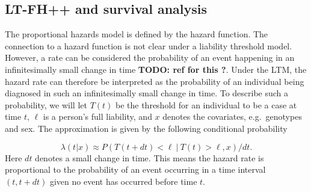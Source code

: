 %

\subsection{LT-FH++ and survival analysis}
The proportional hazards model is defined by the hazard function. The connection to a hazard function is not clear under a liability threshold model. However, a rate can be considered the probability of an event happening in an infinitesimally small change in time \textbf{TODO: ref for this ?}. Under the LTM, the hazard rate can therefore be interpreted as the probability of an individual being diagnosed in such an infinitesimally small change in time\cite{kragh2021analysis}. To describe such a probability, we will let $ T(t) $ be the threshold for an individual to be a case at time $ t $, $ \ell $ is a person's full liability, and $ x $ denotes the covariates, e.g.\ genotypes and sex. The approximation is given by the following conditional probability

\begin{equation}\label{eq:ltm_case_prob_approx}
	\lambda(t|x) \approx 
	P\left(T(t + dt) < \ell ~|~ T(t) > \ell, x \right) / dt.
\end{equation}
Here $ dt $ denotes a small change in time. This means the hazard rate is proportional to the probability of an event occurring in a time interval $ (t, t + dt) $ given no event has occurred before time $ t $.

